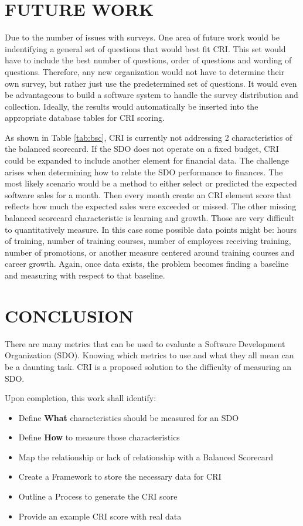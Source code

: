\documentclass[SDSUThesis.tex]{subfiles}
\begin{document}
\section{FUTURE WORK}

Due to the number of issues with surveys.  One area of future work would be indentifying
a general set of questions that would best fit CRI.  This set would have to include
the best number of questions, order of questions and wording of questions.  Therefore,
any new organization would not have to determine their own survey, but rather just use the
predetermined set of questions.  It would even be advantageous to build a software system to
handle the survey distribution and collection.  Ideally, the results would automatically be
inserted into the appropriate database tables for CRI scoring. 

As shown in Table \ref{tab:bsc}, CRI is currently not addressing 2 characteristics of the balanced scorecard.  If the SDO does not operate on a fixed budget, CRI could be 
expanded to include another element for financial data. The challenge arises when
determining how to relate the SDO performance to finances.  The most likely scenario
would be a method to either select or predicted the expected software sales
for a month.  Then every month create an CRI element score that reflects
how much the expected sales were exceeded or missed.  The other missing
balanced scorecard characteristic is learning and growth.  Those are very difficult
to quantitatively measure.  In this case some possible data points might be:
hours of training, number of training courses, number of employees receiving
training, number of promotions, or another measure centered around training
courses and career growth.  Again, once data exists, the problem becomes finding
a baseline and measuring with respect to that baseline.

\section{CONCLUSION}

There are many metrics that can be used to evaluate a Software Development Organization (SDO). 
Knowing which metrics to use and what they all mean can be a daunting task.  CRI is a
proposed solution to the difficulty of measuring an SDO.

Upon completion, this work shall identify:
\begin{itemize}
    \item Define \textbf{What} characteristics should be measured for an SDO
    \item Define \textbf{How} to measure those characteristics
    \item Map the relationship or lack of relationship with a Balanced Scorecard
    \item Create a Framework to store the necessary data for CRI
    \item Outline a Process to generate the CRI score
    \item Provide an example CRI score with real data
\end{itemize}
\end{document}
